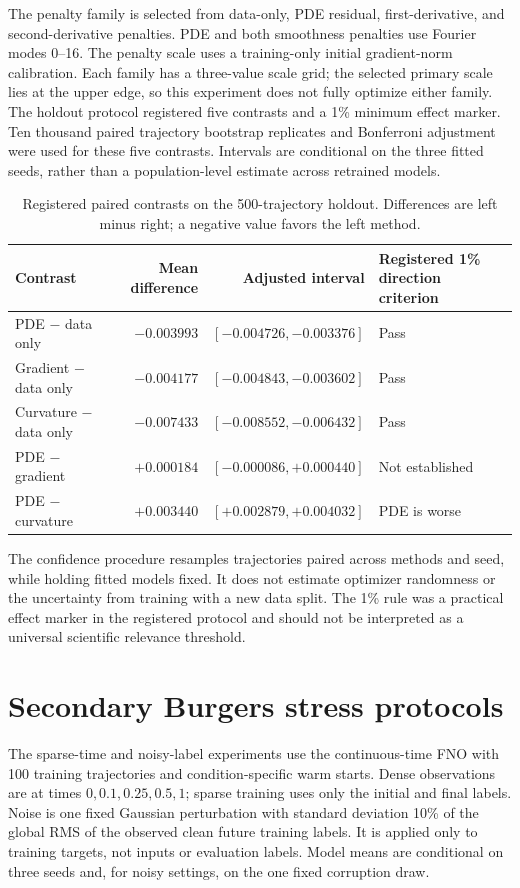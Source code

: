 \documentclass[10pt,a4paper]{article}
\begin{document}
The penalty family is selected from data-only, PDE residual, first-derivative, and second-derivative penalties. PDE and both smoothness penalties use Fourier modes 0--16. The penalty scale uses a training-only initial gradient-norm calibration. Each family has a three-value scale grid; the selected primary scale lies at the upper edge, so this experiment does not fully optimize either family. The holdout protocol registered five contrasts and a 1\% minimum effect marker. Ten thousand paired trajectory bootstrap replicates and Bonferroni adjustment were used for these five contrasts. Intervals are conditional on the three fitted seeds, rather than a population-level estimate across retrained models.

\begin{table}[H]
\centering\small
\caption{Registered paired contrasts on the 500-trajectory holdout. Differences are left minus right; a negative value favors the left method.}
\label{tab:burgers-contrasts}
\begin{tabular}{lrrl}
\toprule
Contrast & Mean difference & Adjusted interval & Registered 1\% direction criterion \\
\midrule
PDE $-$ data only & $-0.003993$ & $[-0.004726,-0.003376]$ & Pass \\
Gradient $-$ data only & $-0.004177$ & $[-0.004843,-0.003602]$ & Pass \\
Curvature $-$ data only & $-0.007433$ & $[-0.008552,-0.006432]$ & Pass \\
PDE $-$ gradient & $+0.000184$ & $[-0.000086,+0.000440]$ & Not established \\
PDE $-$ curvature & $+0.003440$ & $[+0.002879,+0.004032]$ & PDE is worse \\
\bottomrule
\end{tabular}
\end{table}

The confidence procedure resamples trajectories paired across methods and seed, while holding fitted models fixed. It does not estimate optimizer randomness or the uncertainty from training with a new data split. The 1\% rule was a practical effect marker in the registered protocol and should not be interpreted as a universal scientific relevance threshold.

\section{Secondary Burgers stress protocols}
The sparse-time and noisy-label experiments use the continuous-time FNO with 100 training trajectories and condition-specific warm starts. Dense observations are at times $0,0.1,0.25,0.5,1$; sparse training uses only the initial and final labels. Noise is one fixed Gaussian perturbation with standard deviation 10\% of the global RMS of the observed clean future training labels. It is applied only to training targets, not inputs or evaluation labels. Model means are conditional on three seeds and, for noisy settings, on the one fixed corruption draw.
\end{document}
